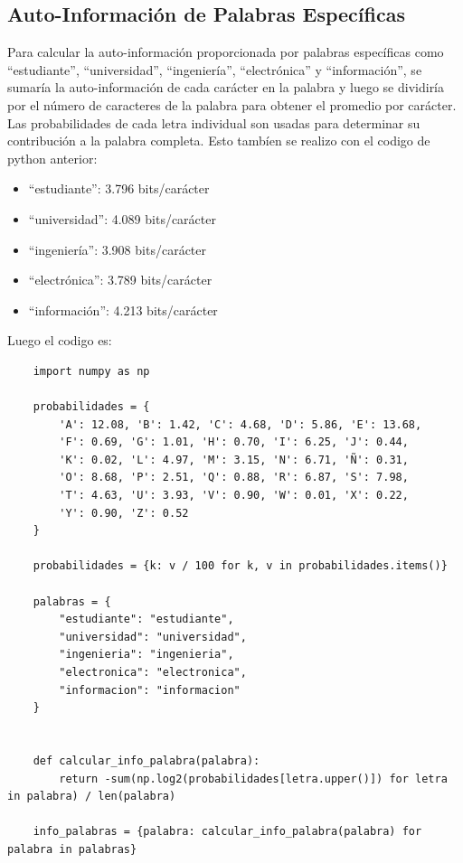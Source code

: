 \documentclass[
  11pt,
  letterpaper,
  answers
]{exam}
\begin{document}
\begin{questions}
\begin{solution}
\begin{parts}
\part{Auto-Información de Palabras Específicas}
Para calcular la auto-información proporcionada por palabras específicas como ``estudiante'', ``universidad'', ``ingeniería'', ``electrónica'' y ``información'', se sumaría la auto-información de cada carácter en la palabra y luego se dividiría por el número de caracteres de la palabra para obtener el promedio por carácter. Las probabilidades de cada letra individual son usadas para determinar su contribución a la palabra completa. Esto tambíen se realizo con el codigo de python anterior:
\begin{itemize}
    \item ``estudiante'': 3.796 bits/carácter
    \item ``universidad'': 4.089 bits/carácter
    \item ``ingeniería'': 3.908 bits/carácter
    \item ``electrónica'': 3.789 bits/carácter
    \item ``información'': 4.213 bits/carácter
\end{itemize}
Luego el codigo es:
\begin{verbatim}
    import numpy as np

    probabilidades = {
        'A': 12.08, 'B': 1.42, 'C': 4.68, 'D': 5.86, 'E': 13.68,
        'F': 0.69, 'G': 1.01, 'H': 0.70, 'I': 6.25, 'J': 0.44,
        'K': 0.02, 'L': 4.97, 'M': 3.15, 'N': 6.71, 'Ñ': 0.31,
        'O': 8.68, 'P': 2.51, 'Q': 0.88, 'R': 6.87, 'S': 7.98,
        'T': 4.63, 'U': 3.93, 'V': 0.90, 'W': 0.01, 'X': 0.22,
        'Y': 0.90, 'Z': 0.52
    }
    
    probabilidades = {k: v / 100 for k, v in probabilidades.items()}

    palabras = {
        "estudiante": "estudiante",
        "universidad": "universidad",
        "ingenieria": "ingenieria",
        "electronica": "electronica",
        "informacion": "informacion"
    }
    

    def calcular_info_palabra(palabra):
        return -sum(np.log2(probabilidades[letra.upper()]) for letra in palabra) / len(palabra)

    info_palabras = {palabra: calcular_info_palabra(palabra) for palabra in palabras}
\end{verbatim}
\end{parts}
\end{solution}
\begin{parts}

\end{parts}
\end{questions}
\end{document}
